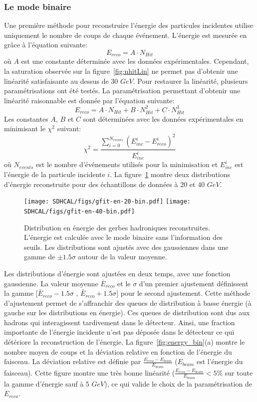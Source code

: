 \subsubsection{Le mode binaire}
Une première méthode pour reconstruire l'énergie des particules incidentes utilise uniquement le nombre de coups de chaque événement. L'énergie est mesurée en grâce à l'équation suivante:
\begin{equation}
  E_{reco} = A \cdot N_{Hit}
\end{equation}
où $A$ est une constante déterminée avec les données expérimentales. Cependant, la saturation observée sur la figure~\ref{fig:nhitLin} ne permet pas d'obtenir une linéarité satisfaisante au dessus de 30 $GeV$. Pour restaurer la linéarité, plusieurs paramétrisations ont été testés. La paramétrisation permettant d'obtenir une linéarité raisonnable est donnée par l'équation suivante:
\begin{equation}
  E_{reco} = A \cdot N_{Hit} + B \cdot N_{Hit}^2 + C \cdot N_{Hit}^3
\end{equation}
Les constantes $A$, $B$ et $C$ sont déterminées avec les données expérimentales en minimisant le $\chi^2$ suivant:
\begin{equation}
  \chi^2 = \frac{\sum_{i=0}^{N_{events}}(E_{inc}^i-E_{reco}^i)^2}{E_{inc}^i}
\end{equation}
où $N_{events}$ est le nombre d'événements utilisés pour la minimisation et $E_{inc}^i$ est l'énergie de la particule incidente $i$. La figure~\ref{fig:energy_dist_bin} montre deux distributions d'énergie reconstruite pour des échantillons de données à 20 et 40 $GeV$. 
\begin{figure}[!h]
  \begin{center}
    \texttt{[image: SDHCAL/figs/gfit-en-20-bin.pdf]}
    \texttt{[image: SDHCAL/figs/gfit-en-40-bin.pdf]}
    \caption{Distribution en énergie des gerbes hadroniques reconstruites. L'énergie est calculée avec le mode binaire sans l'information des seuils. Les distributions sont ajustés avec des gaussiennes dans une gamme de $\pm1.5\sigma$ autour de la valeur moyenne.}
    \label{fig:energy_dist_bin}
  \end{center}
\end{figure}
Les distributions d'énergie sont ajustées en deux temps, avec une fonction gaussienne. La valeur moyenne $\bar{E}_{reco}$ et le $\sigma$ d'un premier ajustement définissent la gamme [$\bar{E}_{reco}-1.5\sigma$ , $\bar{E}_{reco}+1.5\sigma$] pour le second ajustement. Cette méthode d'ajustement permet de s'affranchir des queues de distribution à basse énergie (à gauche sur les distributions en énergie). Ces queues de distribution sont dus aux hadrons qui interagissent tardivement dans le détecteur. Ainsi, une fraction importante de l'énergie incidente n'est pas déposée dans le détecteur ce qui détériore la reconstruction de l'énergie. La figure~\ref{fig:energy_bin}(a) montre le nombre moyen de coups et la déviation relative en fonction de l'énergie du faisceau. La déviation relative est définie par $\frac{E_{reco}-E_{beam}}{E_{beam}}$ ($E_{beam}$ est l'énergie du faisceau). Cette figure montre une très bonne linéarité ($\frac{E_{reco}-E_{beam}}{E_{beam}}<5\%$ sur toute la gamme d'énergie sauf à 5 $GeV$), ce qui valide le choix de la paramétrisation de $E_{reco}$.
